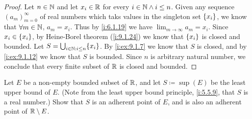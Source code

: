\begin{proof}
  Let \(n \in \mathbb{N}\) and let \(x_i \in \mathbb{R}\) for every \(i \in \mathbb{N} \land i \leq n\).
  Given any sequence \((a_m)_{m = 0}^\infty\) of real numbers which taks values in the singleton set \(\left\lbrace x_i\right\rbrace\), we know that \(\forall m \in \mathbb{N}\), \(a_m = x_i\).
  Thus by \cref{i:6.1.19} we have \(\lim_{m \to \infty} a_m = x_i\).
  Since \(x_i \in \left\lbrace x_i\right\rbrace\), by Heine-Borel theorem (\cref{i:9.1.24}) we know that \(\left\lbrace x_i\right\rbrace\) is closed and bounded.
  Let \(S = \bigcup_{i \in \N : i \leq n} \set{x_i}\).
  By \cref{i:ex:9.1.7} we know that \(S\) is closed, and by \cref{i:ex:9.1.12} we know that \(S\) is bounded.
  Since \(n\) is arbitrary natural number, we conclude that every finite subset of \(\mathbb{R}\) is closed and bounded.
\end{proof}

\begin{ex}\label{i:ex:9.1.15}
  Let \(E\) be a non-empty bounded subset of \(\mathbb{R}\), and let \(S \coloneqq \sup(E)\) be the least upper bound of \(E\).
  (Note from the least upper bound principle, \cref{i:5.5.9}, that \(S\) is a real number.)
  Show that \(S\) is an adherent point of \(E\), and is also an adherent point of \(\mathbb{R} \setminus E\).
\end{ex}

